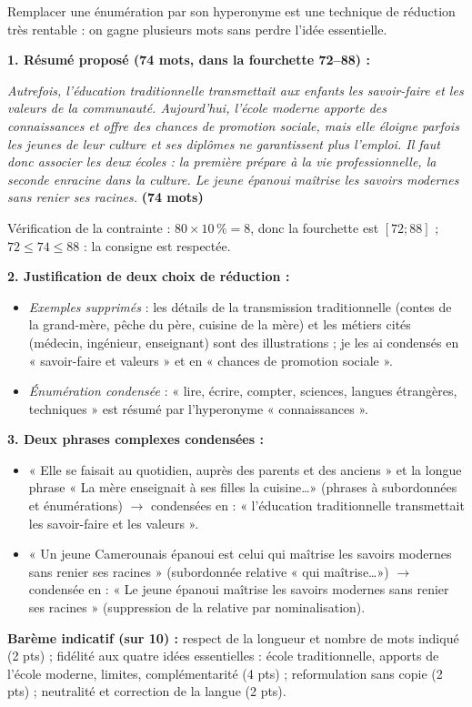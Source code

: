 \documentclass[11pt]{article}
\begin{document}
\begin{aretenir}
Remplacer une énumération par son hyperonyme est une technique de réduction très rentable : on gagne plusieurs mots sans perdre l'idée essentielle.
\end{aretenir}

\begin{corrige}
\textbf{1. Résumé proposé (74 mots, dans la fourchette 72--88) :}

\emph{Autrefois, l'éducation traditionnelle transmettait aux enfants les savoir-faire et les valeurs de la communauté. Aujourd'hui, l'école moderne apporte des connaissances et offre des chances de promotion sociale, mais elle éloigne parfois les jeunes de leur culture et ses diplômes ne garantissent plus l'emploi. Il faut donc associer les deux écoles : la première prépare à la vie professionnelle, la seconde enracine dans la culture. Le jeune épanoui maîtrise les savoirs modernes sans renier ses racines.} \textbf{(74 mots)}

Vérification de la contrainte : $80 \times 10\,\% = 8$, donc la fourchette est $[72 ; 88]$ ; $72 \leq 74 \leq 88$ : la consigne est respectée.

\textbf{2. Justification de deux choix de réduction :}
\begin{itemize}
\item \emph{Exemples supprimés} : les détails de la transmission traditionnelle (contes de la grand-mère, pêche du père, cuisine de la mère) et les métiers cités (médecin, ingénieur, enseignant) sont des illustrations ; je les ai condensés en « savoir-faire et valeurs » et en « chances de promotion sociale ».
\item \emph{Énumération condensée} : « lire, écrire, compter, sciences, langues étrangères, techniques » est résumé par l'hyperonyme « connaissances ».
\end{itemize}

\textbf{3. Deux phrases complexes condensées :}
\begin{itemize}
\item « Elle se faisait au quotidien, auprès des parents et des anciens » et la longue phrase « La mère enseignait à ses filles la cuisine\ldots » (phrases à subordonnées et énumérations) $\rightarrow$ condensées en : « l'éducation traditionnelle transmettait les savoir-faire et les valeurs ».
\item « Un jeune Camerounais épanoui est celui qui maîtrise les savoirs modernes sans renier ses racines » (subordonnée relative « qui maîtrise\ldots ») $\rightarrow$ condensée en : « Le jeune épanoui maîtrise les savoirs modernes sans renier ses racines » (suppression de la relative par nominalisation).
\end{itemize}

\textbf{Barème indicatif (sur 10) :} respect de la longueur et nombre de mots indiqué (2 pts) ; fidélité aux quatre idées essentielles : école traditionnelle, apports de l'école moderne, limites, complémentarité (4 pts) ; reformulation sans copie (2 pts) ; neutralité et correction de la langue (2 pts).
\end{corrige}
\end{document}
